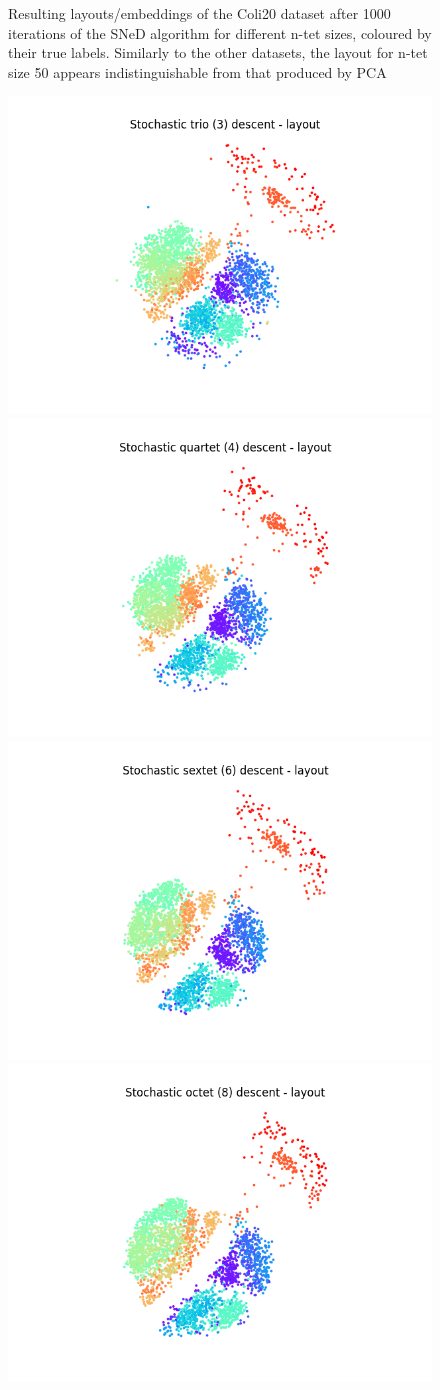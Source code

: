 \documentclass{l4proj}
\begin{document}
\begin{appendices}
\begin{figure}[ht]
    \caption{Resulting layouts/embeddings of the Coli20 dataset after 1000 iterations of the SNeD algorithm for different n-tet sizes, coloured by their true labels. Similarly to the other datasets, the layout for n-tet size 50 appears indistinguishable from that produced by PCA
    }

    \label{fig:init_demo} 
\end{figure}


\begin{figure}[ht]
\centering
    \includegraphics[width=0.4\linewidth]{images/n-tet layouts/mouse RNA/Stochastic trio (3) descent - layout.png} 
    \includegraphics[width=0.4\linewidth]{images/n-tet layouts/mouse RNA/Stochastic quartet (4) descent - layout.png}\\
    \includegraphics[width=0.4\linewidth]{images/n-tet layouts/mouse RNA/Stochastic sextet (6) descent - layout.png} 
    \includegraphics[width=0.4\linewidth]{images/n-tet layouts/mouse RNA/Stochastic octet (8) descent - layout.png}\\

\end{figure}
\end{appendices}
\end{document}
